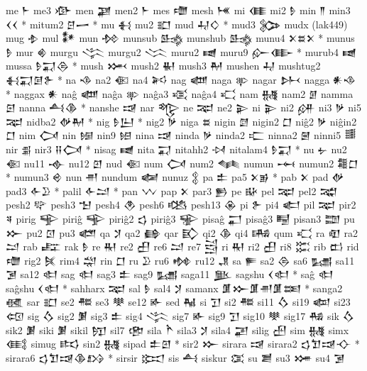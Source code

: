  me  𒈨   
 me3  𒀞   
 men  𒃞   
 men2  𒈨   
 mes  𒈩   
 mesh  𒎌   
 mi  𒈪   
 mi2  𒊩   
 min  𒈫   
 min3  𒌋𒌋 *   
 mitum2  𒆪𒅂 *   
 mu  𒈬   
 mu2  𒊬   
 mud  𒄷𒄭 *   
 mud3  𒉯   
 mudx  (lak449)   
 mug  𒈮   
 mul  𒀯   
 mun  𒁵   
 munsub  𒈰   
 munshub  𒈰   
 munu4  𒉽𒊺𒉽 *   
 munus  𒊩   
 mur  𒄯   
 murgu  𒋞   
 murgu2  𒈱   
 muru2  𒉠   
 muru9  𒅎𒂂 *   
 murub4  𒉠   
 mussa  𒊩𒍑𒁲 *   
 mush  𒈲   
 mush2  𒈽   
 mush3  𒈹   
 mushen  𒄷   
 mushtug2  𒈬𒍑𒌆𒉿 *   
 na  𒈾   
 na2  𒈿   
 na4  𒎎   
 nag  𒅘   
 naga  𒉀   
 nagar  𒉄   
 nagga  𒀭𒈾 *   
 naggax  𒀭   
 naĝ  𒅘   
 naĝa  𒉀   
 naĝa3  𒄤   
 naĝa4  𒄣   
 nam  𒉆   
 nam2  𒉇   
 namma  𒇉   
 nanna  𒋀𒆠 *   
 nanshe  𒀏   
 nar  𒈜   
 ne  𒉈   
 ne2  𒉌   
 ni  𒉌   
 ni2  𒉎   
 ni3  𒃻   
 ni5  𒉈   
 nidba2  𒉻𒈹 *   
 nig  𒊩𒌨 *   
 nig2  𒃻   
 niga  𒊺   
 nigin  𒇔   
 nigin2  𒆸   
 niĝ2  𒃻   
 niĝin2  𒆸   
 nim  𒉏   
 nin  𒎏   
 nin9  𒎐   
 nina  𒀏   
 ninda  𒃻   
 ninda2  𒉒   
 ninna2  𒇧   
 ninni5  𒌃   
 nir  𒉪   
 nir3  𒍝𒉏 *   
 nisag  𒉠   
 nita  𒍑   
 nitahh2  𒀴   
 nitalam4  𒊩𒍑 *   
 nu  𒉡   
 nu2  𒈿   
 nu11  𒉢   
 nu12  𒇻   
 nud  𒈿   
 num  𒉏   
 num2  𒈝   
 numun  𒆰   
 numun2  𒍤𒆸 *   
 numun3  𒄴   
 nun  𒉣   
 nundum  𒅻   
 nunuz  𒉭   
 pa  𒉺   
 pa5  𒉽𒂊 *   
 pab  𒉽   
 pad  𒉻   
 pad3  𒅆𒊒 *   
 palil  𒅆𒁺 *   
 pan  𒉼   
 pap  𒉽   
 par3  𒁖   
 pe  𒄫   
 pel  𒉈   
 pel2  𒉋   
 pesh2  𒉾   
 pesh3  𒈠   
 pesh4  𒊯   
 pesh6  𒆓   
 pesh13  𒊴   
 pi  𒉿   
 pi4  𒅗   
 pil  𒉈   
 pir2  𒎕   
 pirig  𒊊   
 piriĝ  𒊊   
 piriĝ2  𒌓   
 piriĝ3  𒊌   
 pisaĝ  𒂷   
 pisaĝ3  𒋄   
 pisan3  𒊿   
 pu  𒁍   
 pu2  𒇥   
 pu3  𒅤   
 qa  𒋡   
 qa2  𒂵   
 qar  𒃼   
 qi2  𒆠   
 qi4  𒄄   
 qum  𒄣   
 ra  𒊏   
 ra2  𒁺   
 rab  𒊐   
 rak  𒊩   
 re  𒊑   
 re2  𒌷   
 re6  𒁺   
 re7  𒁻   
 ri  𒊑   
 ri2  𒌷   
 ri8  𒈶   
 rib  𒆗   
 rid  𒈩   
 rig2  𒍮   
 rim4  𒁽   
 rin  𒆸   
 ru  𒊒   
 ru6  𒂔   
 ru12  𒂗   
 sa  𒊓   
 sa2  𒁲   
 sa6  𒊷   
 sa11  𒋜   
 sa12  𒊕   
 sag  𒊕   
 sag3  𒉺   
 sag9  𒊷   
 saga11  𒆥   
 sagshu  𒌋𒊕 *   
 saĝ  𒊕   
 saĝshu  𒌋𒊕 *   
 sahharx  𒉈   
 sal  𒊩   
 sal4  𒋡   
 samanx  𒂠𒁍𒂠𒉣𒂠𒌅 *   
 sanga2  𒊫   
 sar  𒊬   
 se2  𒍣   
 se3  𒋧   
 se12  𒅊   
 sed  𒈻   
 si  𒋛   
 si2  𒍣   
 si11  𒋝   
 si19  𒆉   
 si23  𒄢   
 sig  𒋝   
 sig2  𒋠   
 sig3  𒉺   
 sig4  𒋞   
 sig7  𒅊   
 sig9  𒋛   
 sig10  𒋧   
 sig17  𒄀   
 sik  𒋝   
 sik2  𒋠   
 siki  𒋠   
 sikil  𒂖   
 sil7  𒂣   
 sila  𒋻   
 sila3  𒋡   
 sila4  𒃢   
 silig  𒍂   
 sim  𒉆   
 simx  𒍼   
 simug  𒌣   
 sin2  𒉆   
 sipad  𒉺𒇻 *   
 sir2  𒁍   
 sirara  𒀏   
 sirara2  𒌓𒈣𒀏𒋓 *   
 sirara6  𒌓𒈣𒀏𒆠𒋳 *   
 sirsir  𒁎   
 sis  𒋀   
 siskur  𒀬   
 su  𒋢   
 su3  𒋤   
 su4  𒋜   
